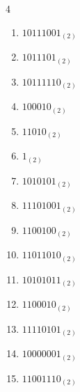\begin{multicols}{4}
\begin{enumerate}
        \phantom{$=235$}

  \item $10111001_{(2)}$

        \phantom{$=185$}

\columnbreak %

  \item $1011101_{(2)}$

        \phantom{$=93$}

  \item $10111110_{(2)}$

        \phantom{$=190$}

  \item $100010_{(2)}$

        \phantom{$=34$}

  \item $11010_{(2)}$

        \phantom{$=26$}

  \item $1_{(2)}$

        \phantom{$=1$}

  \item $1010101_{(2)}$

        \phantom{$=85$}

  \item $11101001_{(2)}$

        \phantom{$=233$}

  \item $1100100_{(2)}$

        \phantom{$=100$}

  \item $11011010_{(2)}$

        \phantom{$=218$}

  \item $10101011_{(2)}$

        \phantom{$=171$}

  \item $1100010_{(2)}$

        \phantom{$=98$}

  \item $11110101_{(2)}$

        \phantom{$=245$}

  \item $10000001_{(2)}$

        \phantom{$=129$}

  \item $11001110_{(2)}$


\end{enumerate}
\end{multicols}
